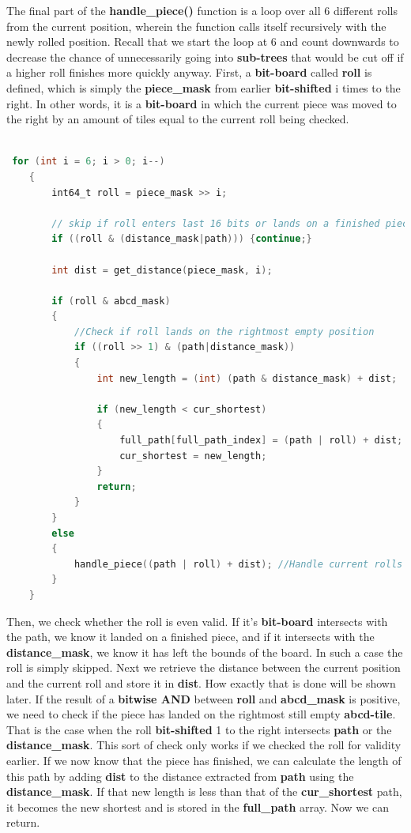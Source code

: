\documentclass[12pt]{article}
\begin{document}
The final part of the \textbf{handle\_piece()} function is a loop over all 6 different rolls from the current position, wherein the function calls itself recursively with the newly rolled position. Recall that we start the loop at 6 and count downwards to decrease the chance of unnecessarily going into \textbf{sub-trees} that would be cut off if a higher roll finishes more quickly anyway.
First, a \textbf{bit-board} called \textbf{roll} is defined, which is simply the \textbf{piece\_mask} from earlier \textbf{bit-shifted} i times to the right. In other words, it is a \textbf{bit-board} in which the current piece was moved to the right by an amount of tiles equal to the current roll being checked.

\begin{lstlisting}[language=C, caption={Roll loop}, label={lst:roll-loop}]

 for (int i = 6; i > 0; i--)
    {
        int64_t roll = piece_mask >> i;

        // skip if roll enters last 16 bits or lands on a finished piece
        if ((roll & (distance_mask|path))) {continue;}

        int dist = get_distance(piece_mask, i);

        if (roll & abcd_mask)
        {
            //Check if roll lands on the rightmost empty position
            if ((roll >> 1) & (path|distance_mask))
            {
                int new_length = (int) (path & distance_mask) + dist;

                if (new_length < cur_shortest)
                {
                    full_path[full_path_index] = (path | roll) + dist;
                    cur_shortest = new_length;
                }
                return;
            }
        }
        else
        {
            handle_piece((path | roll) + dist); //Handle current rolls subtree
        }
    }

\end{lstlisting}

Then, we check whether the roll is even valid. If it's \textbf{bit-board} intersects with the path, we know it landed on a finished piece, and if it intersects with the \textbf{distance\_mask}, we know it has left the bounds of the board. In such a case the roll is simply skipped.
Next we retrieve the distance between the current position and the current roll and store it in \textbf{dist}. How exactly that is done will be shown later. If the result of a \textbf{bitwise AND} between \textbf{roll} and \textbf{abcd\_mask} is positive, we need to check if the piece has landed on the rightmost still empty \textbf{abcd-tile}. That is the case when the roll \textbf{bit-shifted} 1 to the right intersects \textbf{path} or the \textbf{distance\_mask}. This sort of check only works if we checked the roll for validity earlier. If we now know that the piece has finished, we can calculate the length of this path by adding \textbf{dist} to the distance extracted from \textbf{path} using the \textbf{distance\_mask}. If that new length is less than that of the \textbf{cur\_shortest} path, it becomes the new shortest and is stored in the \textbf{full\_path} array. Now we can return.
\end{document}
